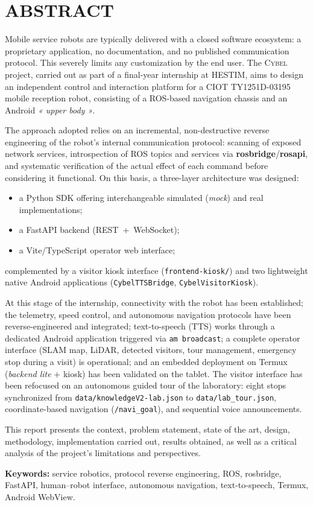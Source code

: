 \section*{\centering ABSTRACT}

Mobile service robots are typically delivered with a closed software ecosystem: a proprietary
application, no documentation, and no published communication protocol. This severely limits any
customization by the end user. The \textsc{Cybel} project, carried out as part of a final-year
internship at HESTIM, aims to design an independent control and interaction platform for a CIOT
TY1251D-03195 mobile reception robot, consisting of a ROS-based navigation chassis and an Android
\emph{« upper body »}.

The approach adopted relies on an incremental, non-destructive reverse engineering of the robot's
internal communication protocol: scanning of exposed network services, introspection of ROS
topics and services via \textbf{rosbridge}/\textbf{rosapi}, and systematic verification of the
actual effect of each command before considering it functional. On this basis, a three-layer
architecture was designed:
\begin{itemize}
    \item a Python SDK offering interchangeable simulated (\emph{mock}) and real implementations;
    \item a FastAPI backend (REST~+~WebSocket);
    \item a Vite/TypeScript operator web interface;
\end{itemize}
complemented by a visitor kiosk interface (\texttt{frontend-kiosk/}) and two lightweight native
Android applications (\texttt{CybelTTSBridge}, \texttt{CybelVisitorKiosk}).

At this stage of the internship, connectivity with the robot has been established; the
telemetry, speed control, and autonomous navigation protocols have been reverse-engineered and
integrated; text-to-speech (TTS) works through a dedicated Android application triggered via
\texttt{am broadcast}; a complete operator interface (SLAM map, LiDAR, detected visitors, tour
management, emergency stop during a visit) is operational; and an embedded deployment on Termux
(\emph{backend lite} + kiosk) has been validated on the tablet. The visitor interface has been
refocused on an autonomous guided tour of the laboratory: eight stops synchronized from
\texttt{data/knowledgeV2-lab.json} to \texttt{data/lab\_tour.json}, coordinate-based navigation
(\texttt{/navi\_goal}), and sequential voice announcements.

This report presents the context, problem statement, state of the art, design, methodology,
implementation carried out, results obtained, as well as a critical analysis of the project's
limitations and perspectives.

\bigskip
\noindent\textbf{Keywords:} service robotics, protocol reverse engineering, ROS, rosbridge,
FastAPI, human–robot interface, autonomous navigation, text-to-speech, Termux, Android WebView.